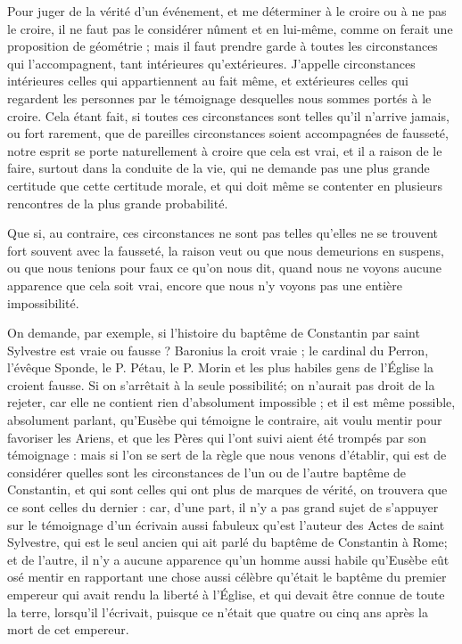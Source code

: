 Pour juger de la vérité d'un événement, et me déterminer à le croire ou à ne pas le croire, il ne faut pas le considérer nûment et en lui-même, comme on ferait une proposition de géométrie ; mais il faut prendre garde à toutes les circonstances qui l'accompagnent, tant intérieures qu'extérieures. J'appelle circonstances intérieures celles qui appartiennent au fait même, et extérieures celles qui regardent les personnes par le témoignage desquelles nous sommes portés à le croire. Cela étant fait, si toutes ces circonstances sont telles qu'il n'arrive jamais, ou fort rarement, que de pareilles circonstances soient accompagnées de fausseté, notre esprit se porte naturellement à croire que cela est vrai, et il a raison de le faire, surtout dans la conduite de la vie, qui ne demande pas une plus grande certitude que cette certitude morale, et qui doit même se contenter en plusieurs rencontres de la plus grande probabilité.

Que si, au contraire, ces circonstances ne sont pas telles qu'elles ne se trouvent fort souvent avec la fausseté, la raison veut ou que nous demeurions en suspens, ou que nous tenions pour faux ce qu'on nous dit, quand nous ne voyons aucune apparence que cela soit vrai, encore que nous n'y voyons pas une entière impossibilité.

On demande, par exemple, si l'histoire du baptême de Constantin par saint Sylvestre est vraie ou fausse ? Baronius la croit vraie ; le cardinal du Perron, l'évêque Sponde, le P. Pétau, le P. Morin et les plus habiles gens de l'Église la croient fausse. Si on s'arrêtait à la seule possibilité; on n'aurait pas droit de la rejeter, car elle ne contient rien d'absolument impossible ; et il est même possible, absolument parlant, qu'Eusèbe qui témoigne le contraire, ait voulu mentir pour favoriser les Ariens, et que les Pères qui l'ont suivi aient été trompés par son témoignage : mais si l'on se sert de la règle que nous venons d'établir, qui est de considérer quelles sont les circonstances de l'un ou de l'autre baptême de Constantin, et qui sont celles qui ont plus de marques de vérité, on trouvera que ce sont celles du dernier : car, d'une part, il n'y a pas grand sujet de s'appuyer sur le témoignage d'un écrivain aussi fabuleux qu'est l'auteur des Actes de saint Sylvestre, qui est le seul ancien qui ait parlé du baptême de Constantin à Rome; et de l'autre, il n'y a aucune apparence qu'un homme aussi habile qu'Eusèbe eût osé mentir en rapportant une chose aussi célèbre qu'était le baptême du premier empereur qui avait rendu la liberté à l'Église, et qui devait être connue de toute la terre, lorsqu'il l'écrivait, puisque ce n'était que quatre ou cinq ans après la mort de cet empereur.

